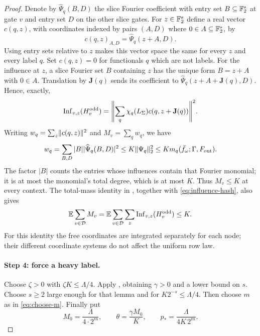 \begin{proof}
Denote by
$\widehat\Psi_q(B,D)$ the slice Fourier coefficient with entry set
$B\subseteq\mathbb F_2^s$ at gate $v$ and entry set $D$ on the other slice gates.
For $z\in\mathbb F_2^s$ define a real vector $c(q,z)$, with coordinates indexed by
pairs $(A,D)$ where $0\in A\subseteq\mathbb F_2^s$, by
\[
 c(q,z)_{A,D}=\widehat\Psi_q(z+A,D).
\]
Using entry sets relative to $z$ makes this vector space the same for
every $z$ and every label $q$.
Set $c(q,z)=0$ for functionals $q$ which are not labels. For the influence
at $z$, a slice Fourier set $B$ containing $z$ has the unique form
$B=z+A$ with $0\in A$. Translation by $\mathbf J(q)$ sends its coefficient
to $\widehat\Psi_q(z+A+\mathbf J(q),D)$. Hence, exactly,
\begin{equation}\label{eq:influence-hash}
 \Inf_{v,z}(H_v^{\mathrm{odd}})
 =\norm*{\sum_q\chi_q(L_\Sigma)c(q,z+\mathbf J(q))}^2.
\end{equation}
Writing $w_q=\sum_z\lVert c(q,z)\rVert^2$ and $M_v=\sum_qw_q$, we have
\begin{equation}\label{eq:wq-mq}
 w_q=\sum_{B,D}|B|\lvert\widehat\Psi_q(B,D)\rvert^2
 \le K\lVert\Psi_q\rVert_2^2
 \le K m_q(\bar f_\omega;\Gamma,F_{\mathrm{out}}).
\end{equation}
The factor $|B|$ counts the entries whose influences contain that
Fourier monomial; it is at most the monomial's total degree, which is
at most $K$.
Thus $M_v\le K$ at every context. The total-mass identity in
, together with \eqref{eq:influence-hash}, also gives
\begin{equation}\label{eq:sum-M}
 \mathbb E\sum_{v\in\mathcal D}M_v
 =\mathbb E\sum_{v\in\mathcal D}\sum_z
     \operatorname{Inf}_{v,z}(H_v^{\mathrm{odd}})\le K.
\end{equation}
For this identity the free coordinates are integrated separately for each
node; their different coordinate systems do not affect the uniform row law.

\paragraph{Step 4: force a heavy label.}
Choose $\zeta>0$ with $\zeta K\le\Lambda/4$. Apply
, obtaining $\gamma>0$ and a lower bound on $s$.
Choose $s\ge2$ large enough for that lemma and for
$K2^{-s}\le\Lambda/4$. Then choose $m$ as in \eqref{eq:choose-m}.
Finally put
\begin{equation}\label{eq:extraction-constants}
 M_0=\frac{\Lambda}{4\cdot2^m},\qquad
 \theta=\frac{\gamma M_0}{K},\qquad
 p_* =\frac{\Lambda}{4K\,2^m}.
\end{equation}


\end{proof}
